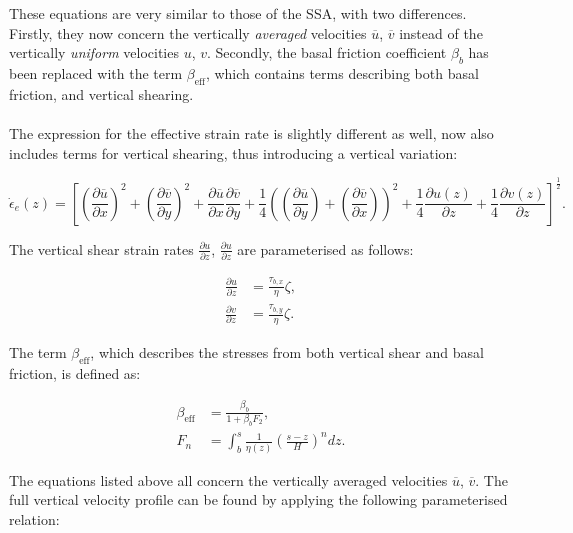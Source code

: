 \documentclass{article}
\begin{document}
These equations are very similar to those of the SSA, with two differences. Firstly, they now concern the vertically \emph{ averaged} velocities $\overline{u}$, $\overline{v}$ instead of the vertically \emph{uniform} velocities $u$, $v$. Secondly, the basal friction coefficient $\beta_b$ has been replaced with the term $\beta_{\textrm{eff}}$, which contains terms describing both basal friction, and vertical shearing.\\
\\
The expression for the effective strain rate is slightly different as well, now also includes terms for vertical shearing, thus introducing a vertical variation:

\begin{equation} \label{eq:DIVA_02}
{\dot{\epsilon}}_e \left( z \right) = { \left[ {\left( \frac{\partial \overline{u}}{\partial x} \right) }^2 + {\left( \frac{\partial \overline{v}}{\partial y} \right) }^2 + \frac{\partial \overline{u}}{\partial x} \frac{\partial \overline{v}}{\partial y} + \frac14 {\left( {\left( \frac{\partial \overline{u}}{\partial y} \right) } + {\left( \frac{\partial \overline{v}}{\partial x} \right) } \right)}^2 + \frac14 \frac{\partial u \left( z \right)}{\partial z} + \frac14 \frac{\partial v \left( z \right)}{\partial z} \right] }^{\frac12}.
\end{equation}

The vertical shear strain rates $\frac{\partial u}{\partial z}$, $\frac{\partial u}{\partial z}$ are parameterised as follows:

\begin{align}
\frac{\partial u}{\partial z} &= \frac{\tau_{b,x}}{\eta} \zeta, \\
\frac{\partial v}{\partial z} &= \frac{\tau_{b,y}}{\eta} \zeta.
\end{align} 

The term $\beta_{\textrm{eff}}$, which describes the stresses from both vertical shear and basal friction, is defined as:

\begin{align} \label{DIVA_03}
\beta_{\textrm{eff}} &= \frac{\beta_b}{1 + \beta_b F_2}, \\
F_n &= \int_b^s \frac{1}{\eta \left( z \right)} {\left( \frac{s - z}{H} \right)}^n dz.
\end{align}

The equations listed above all concern the vertically averaged velocities $\overline{u}$, $\overline{v}$. The full vertical velocity profile can be found by applying the following parameterised relation:
\end{document}
